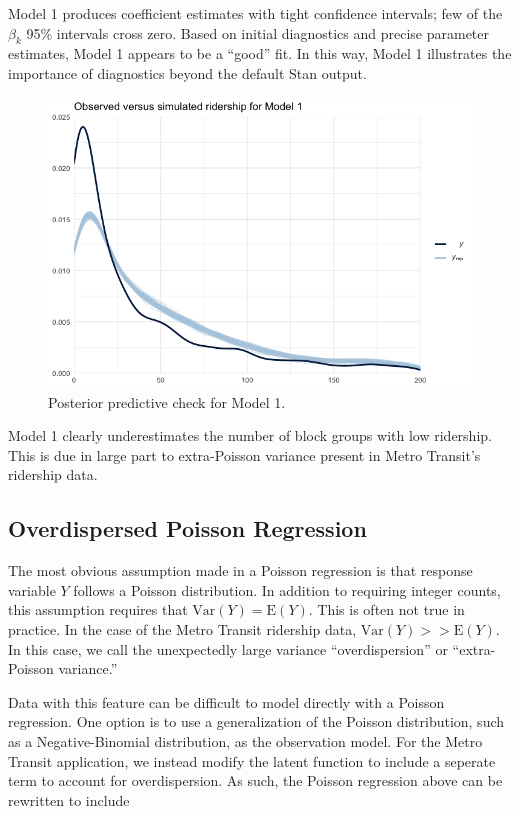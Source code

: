 \documentclass[]{article}
\begin{document}
Model 1 produces coefficient estimates with tight confidence intervals;
few of the \(\beta_k\) 95\% intervals cross zero. Based on initial
diagnostics and precise parameter estimates, Model 1 appears to be a
``good'' fit. In this way, Model 1 illustrates the importance of
diagnostics beyond the default Stan output.

\begin{figure}[H]
  \centering
  \includegraphics[width = 6in]{ppcheck_mod1.png}
  \caption{Posterior predictive check for Model 1.}
\end{figure}

Model 1 clearly underestimates the number of block groups with low
ridership. This is due in large part to extra-Poisson variance present
in Metro Transit's ridership data.

\subsection{Overdispersed Poisson
Regression}\label{overdispersed-poisson-regression}

The most obvious assumption made in a Poisson regression is that
response variable \(Y\) follows a Poisson distribution. In addition to
requiring integer counts, this assumption requires that
\(\text{Var}(Y) = \text{E}(Y)\). This is often not true in practice. In
the case of the Metro Transit ridership data,
\(\text{Var}(Y) >>\text{E}(Y)\). In this case, we call the unexpectedly
large variance ``overdispersion'' or ``extra-Poisson variance.''

Data with this feature can be difficult to model directly with a Poisson
regression. One option is to use a generalization of the Poisson
distribution, such as a Negative-Binomial distribution, as the
observation model. For the Metro Transit application, we instead modify
the latent function to include a seperate term to account for
overdispersion. As such, the Poisson regression above can be rewritten
to include
\end{document}
